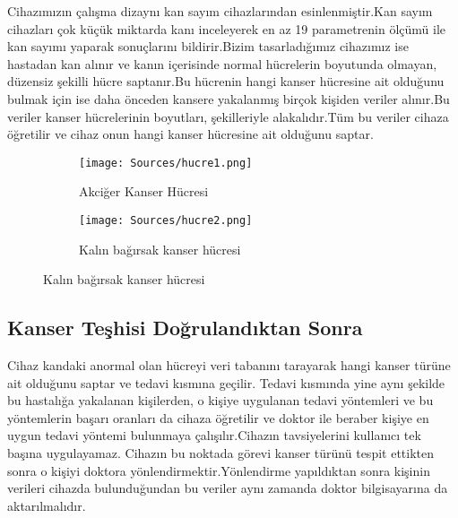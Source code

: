 \documentclass[isoft]{ssltexposter}
\begin{document}
\begin{poster}
       Cihazımızın çalışma dizaynı kan sayım cihazlarından esinlenmiştir.Kan sayım  cihazları çok küçük miktarda kanı inceleyerek en az 19 parametrenin ölçümü ile kan sayımı yaparak sonuçlarını bildirir.Bizim tasarladığımız cihazımız ise hastadan kan alınır ve kanın içerisinde normal hücrelerin boyutunda olmayan, düzensiz şekilli hücre saptanır.Bu hücrenin hangi kanser hücresine ait olduğunu bulmak için ise daha önceden kansere yakalanmış birçok kişiden veriler alınır.Bu veriler kanser hücrelerinin boyutları, şekilleriyle alakalıdır.Tüm bu veriler cihaza öğretilir ve cihaz onun hangi kanser hücresine ait olduğunu saptar.

        \vspace{5pt}
        \begin{figure}
            \hspace{0.8cm}
            \begin{subfigure}[a]{0.2\textwidth}
                \texttt{[image: Sources/hucre1.png]}
                \caption{{\tiny Akciğer Kanser Hücresi}}
            \end{subfigure}
            \hspace{2.8cm}
            \begin{subfigure}[a]{0.2\textwidth}
                \texttt{[image: Sources/hucre2.png]}
                \caption{{\tiny Kalın bağırsak kanser hücresi}}
            \end{subfigure}
        \end{figure}\vspace{-10}
        

    \subsection{Kanser Teşhisi Doğrulandıktan Sonra}
        
           Cihaz kandaki anormal olan hücreyi veri tabanını tarayarak hangi kanser türüne ait olduğunu saptar ve tedavi kısmına geçilir.
        Tedavi kısmında yine aynı şekilde bu hastalığa yakalanan kişilerden, o kişiye uygulanan tedavi yöntemleri ve bu yöntemlerin başarı oranları da cihaza öğretilir ve doktor ile beraber kişiye en uygun tedavi yöntemi bulunmaya çalışılır.Cihazın tavsiyelerini kullanıcı tek başına uygulayamaz. Cihazın bu noktada görevi kanser türünü  tespit ettikten sonra o kişiyi doktora yönlendirmektir.Yönlendirme yapıldıktan sonra kişinin verileri cihazda bulunduğundan bu veriler aynı zamanda doktor bilgisayarına da aktarılmalıdır.


\end{poster}
\end{document}
